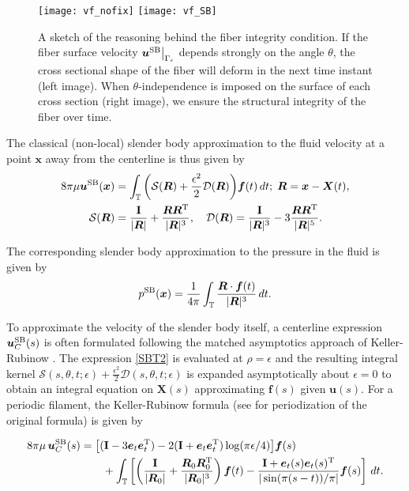 \documentclass[11pt]{article}
\numberwithin{equation}{section}
\newcommand{\T}{\mathbb{T}}
\newcommand{\bu}{\bm{u}}
\newcommand{\bx}{\bm{x}}
\newcommand{\X}{\bm{X}}
\newcommand{\be}{\bm{e}}
\newcommand{\ts}{\thinspace}
\newcommand{\SB}{{\rm SB}}
\newcommand{\abs}[1]{\left\lvert #1 \right\rvert}
\newcommand{\mc}[1]{\mathcal{#1}}
\theoremstyle{definition}
\begin{document}
\begin{figure}[!h]
\centering
\texttt{[image: vf\_nofix]}
\texttt{[image: vf\_SB]}
\caption{A sketch of the reasoning behind the fiber integrity condition. If the fiber surface velocity $\bu^{\SB}\big|_{\Gamma_{\epsilon}}$ depends strongly on the angle $\theta$, the cross sectional shape of the fiber will deform in the next time instant (left image). When $\theta$-independence is imposed on the surface of each cross section (right image), we ensure the structural integrity of the fiber over time.}
\label{fig:fiber_integ}
\end{figure}

The classical (non-local) slender body approximation to the fluid velocity at a point $\bx$ away from the centerline is thus given by 
\begin{equation}\label{SBT2}
\begin{aligned}
8\pi\mu\bu^{\SB}(\bx) &= \int_{\T}\bigg( \mathcal{S}(\bm{R}) +\frac{\epsilon^2}{2}\mathcal{D}(\bm{R}) \bigg){\bm f}(t) \ts dt; \; \bm{R} = \bx-\X(t), \\
\mc{S}(\bm{R}) &= \frac{{\bf I}}{\abs{\bm{R}}} + \frac{\bm{R}\bm{R}^{\rm T}}{|\bm{R}|^3}, \quad \mc{D}(\bm{R}) = \frac{{\bf I}}{|\bm{R}|^3} - 3\frac{\bm{R}\bm{R}^{\rm T} }{|\bm{R}|^5}.
\end{aligned}
\end{equation}

The corresponding slender body approximation to the pressure in the fluid is given by 
\begin{equation}\label{SB_press0}
p^{\SB}(\bx) = \frac{1}{4\pi}\int_{\T} \frac{\bm{R}\cdot {\bm f}(t)}{|\bm{R}|^3} \ts dt. 
\end{equation}

To approximate the velocity of the slender body itself, a centerline expression $\bu^{\SB}_C(s)$ is often formulated following the matched asymptotics approach of Keller-Rubinow \cite{keller1976slender}. The expression \eqref{SBT2} is evaluated at $\rho=\epsilon$ and the resulting integral kernel $\mc{S}(s,\theta,t;\epsilon) + \frac{\epsilon^2}{2}\mc{D}(s,\theta,t;\epsilon)$ is expanded asymptotically about $\epsilon=0$ to obtain an integral equation on $\X(s)$ approximating $\bm{f}(s)$ given $\bu(s)$. For a periodic filament, the Keller-Rubinow formula (see \cite{shelley2000stokesian, cortez2012slender} for periodization of the original formula) is given by 

\begin{equation}\label{SBT_asymp}
\begin{aligned}
8\pi \mu \ts \bu^{\SB}_C(s) &= \big[({\bf I}- 3\be_t\be_t^{\rm T})-2({\bf I}+\be_t\be_t^{\rm T}) \log(\pi\epsilon/4) \big]{\bm f}(s) \\
&\qquad + \int_{\T} \left[ \left(\frac{{\bf I}}{|\bm{R}_0|}+ \frac{\bm{R}_0\bm{R}_0^{\rm T}}{|\bm{R}_0|^3}\right){\bm f}(t) - \frac{{\bf I}+\be_t(s)\be_t(s)^{\rm T} }{|\sin (\pi(s-t))/\pi|} {\bm f}(s)\right] \ts dt.
\end{aligned}
\end{equation}
\end{document}
